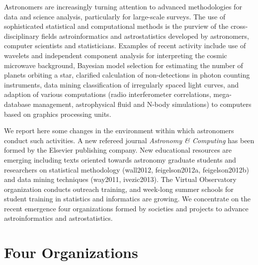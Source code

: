 Astronomers are increasingly turning attention to advanced methodologies for data and science analysis, particularly for large-scale surveys. The use of sophisticated statistical and computational methods is the purview of the cross-disciplinary fields astroinformatics and astrostatistics developed by astronomers, computer scientists and statisticians. Examples of recent activity include use of wavelets and independent component analysis for interpreting the cosmic microwave background, Bayesian model selection for estimating the number of planets orbiting a star, clarified calculation of non-detections in photon counting instruments, data mining classification of irregularly spaced light curves, and adaption of various computations (radio interferometer correlations, mega-database management, astrophysical fluid and N-body simulations) to computers based on graphics processing units.  

We report here some changes in the environment within which astronomers conduct such activities.  A new refereed journal {\it Astronomy \& Computing} has been formed by the Elsevier publishing company.  New educational resources are emerging including texts oriented towards astronomy graduate students and researchers on statistical methodology (wall2012, feigelson2012a, feigelson2012b) and data mining techniques (way2011, ivezic2013).  The Virtual Observatory organization conducts outreach training, and week-long summer schools for student training in statistics and informatics are growing.   We concentrate on the recent emergence four organizations formed by societies and projects to advance astroinformatics and astrostatistics.  

\section{Four Organizations}

